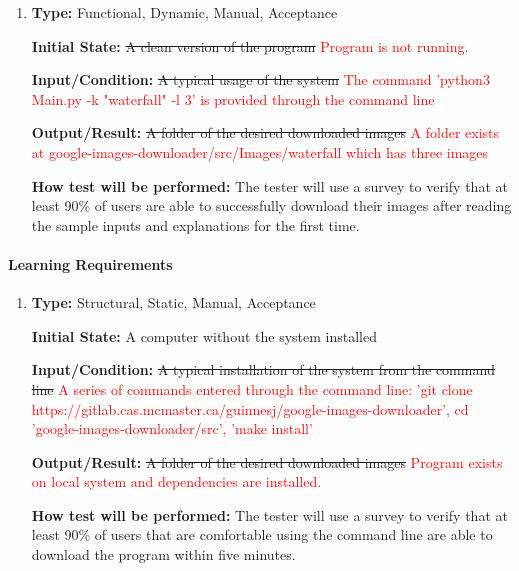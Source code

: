 \documentclass[12pt, titlepage]{article}
\begin{document}
\begin{enumerate}[label=NFR-EUR\arabic*:, wide=0pt, leftmargin=*]

\item \phantom{empty}

\textbf{Type:} Functional, Dynamic, Manual, Acceptance
					
\textbf{Initial State:} \sout{A clean version of the program} \textcolor{red}{Program is not running.}
					
\textbf{Input/Condition:} \sout{A typical usage of the system} 
\textcolor{red}{\textcolor{red}{The command 'python3 Main.py -k "waterfall" -l 3' is provided through the command line}}
					
\textbf{Output/Result:} \sout{A folder of the desired downloaded images}
\textcolor{red}{A folder exists at google-images-downloader/src/Images/waterfall which has three images}
					
\textbf{How test will be performed:} The tester will use a survey to verify that at least 90\% of users are able to successfully download their images after reading the sample inputs and explanations for the first time.

\end{enumerate}

\paragraph{Learning Requirements}

\begin{enumerate}[label=NFR-LR\textcolor{red}{2}:, wide=0pt, leftmargin=*]

\item \phantom{empty}

\textbf{Type:} Structural, Static, Manual, Acceptance
					
\textbf{Initial State:} A computer without the system installed
					
\textbf{Input/Condition:} \sout{A typical installation of the system from the command line}
\textcolor{red}{A series of commands entered through the command line: 'git clone https://gitlab.cas.mcmaster.ca/guinnesj/google-images-downloader', 
cd 'google-images-downloader/src', 'make install'}
					
\textbf{Output/Result:} \sout{A folder of the desired downloaded images}
\textcolor{red}{Program exists on local system and dependencies are installed.}
					
\textbf{How test will be performed:} The tester will use a survey to verify that at least 90\% of users that are comfortable using the command line are able to download the program within five minutes.

\end{enumerate}
\end{document}
